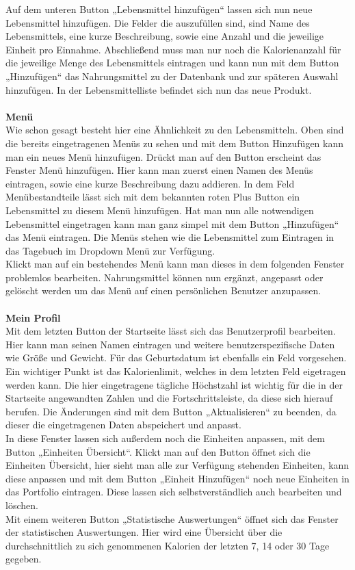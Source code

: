 Auf dem unteren Button „Lebensmittel hinzufügen“ lassen sich nun neue Lebensmittel hinzufügen. Die Felder die auszufüllen sind, sind Name des Lebensmittels, eine kurze Beschreibung, sowie eine Anzahl und die jeweilige Einheit pro Einnahme. Abschließend muss man nur noch die Kalorienanzahl für die jeweilige Menge des Lebensmittels eintragen und kann nun mit dem Button „Hinzufügen“ das Nahrungsmittel zu der Datenbank und zur späteren Auswahl hinzufügen. In der Lebensmittelliste befindet sich nun das neue Produkt. \\
\\
\textbf{Menü} \\
Wie schon gesagt besteht hier eine Ähnlichkeit zu den Lebensmitteln. Oben sind die bereits eingetragenen Menüs zu sehen und mit dem Button Hinzufügen kann man ein neues Menü hinzufügen. Drückt man auf den Button erscheint das Fenster Menü hinzufügen. Hier kann man zuerst einen Namen des Menüs eintragen, sowie eine kurze Beschreibung dazu addieren. In dem Feld Menübestandteile lässt sich mit dem bekannten roten Plus Button ein Lebensmittel zu diesem Menü hinzufügen. Hat man nun alle notwendigen Lebensmittel eingetragen kann man ganz simpel mit dem Button „Hinzufügen“ das Menü eintragen. Die Menüs stehen wie die Lebensmittel zum Eintragen in das Tagebuch im Dropdown Menü zur Verfügung. \\
Klickt man auf ein bestehendes Menü kann man dieses in dem folgenden Fenster problemlos bearbeiten. Nahrungsmittel können nun ergänzt, angepasst oder gelöscht werden um das Menü auf einen persönlichen Benutzer anzupassen.\\
\\
\textbf{Mein Profil} \\
Mit dem letzten Button der Startseite lässt sich das Benutzerprofil bearbeiten. Hier kann man seinen Namen eintragen und weitere benutzerspezifische Daten wie Größe und Gewicht. Für das Geburtsdatum ist ebenfalls ein Feld vorgesehen. Ein wichtiger Punkt ist das Kalorienlimit, welches in dem letzten Feld eigetragen werden kann. Die hier eingetragene tägliche Höchstzahl ist wichtig für die in der Startseite angewandten Zahlen und die Fortschrittsleiste, da diese sich hierauf berufen. Die Änderungen sind mit dem Button „Aktualisieren“ zu beenden, da dieser die eingetragenen Daten abspeichert und anpasst. \\
In diese Fenster lassen sich außerdem noch die Einheiten anpassen, mit dem Button „Einheiten Übersicht“. Klickt man auf den Button öffnet sich die Einheiten Übersicht, hier sieht man alle zur Verfügung stehenden Einheiten, kann diese anpassen und mit dem Button „Einheit Hinzufügen“ noch neue Einheiten in das Portfolio eintragen. Diese lassen sich selbstverständlich auch bearbeiten und löschen. \\
Mit einem weiteren Button „Statistische Auswertungen“ öffnet sich das Fenster der statistischen Auswertungen. Hier wird eine Übersicht über die durchschnittlich zu sich genommenen Kalorien der letzten 7, 14 oder 30 Tage gegeben.
